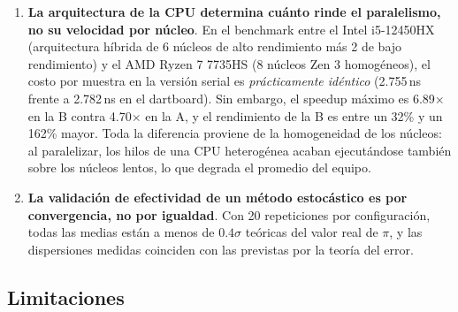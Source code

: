 \begin{enumerate}
    \item \textbf{La arquitectura de la CPU determina cuánto rinde el paralelismo, no su velocidad por núcleo}. En el benchmark entre el Intel i5-12450HX (arquitectura híbrida de 6 núcleos de alto rendimiento más 2 de bajo rendimiento) y el AMD Ryzen 7 7735HS (8 núcleos Zen 3 homogéneos), el costo por muestra en la versión serial es \emph{prácticamente idéntico} (2.755\,ns frente a 2.782\,ns en el dartboard). Sin embargo, el speedup máximo es 6.89$\times$ en la B contra 4.70$\times$ en la A, y el rendimiento de la B es entre un 32\% y un 162\% mayor. Toda la diferencia proviene de la homogeneidad de los núcleos: al paralelizar, los hilos de una CPU heterogénea acaban ejecutándose también sobre los núcleos lentos, lo que degrada el promedio del equipo.

    \item \textbf{La validación de efectividad de un método estocástico es por convergencia, no por igualdad}. Con 20 repeticiones por configuración, todas las medias están a menos de $0.4\sigma$ teóricas del valor real de $\pi$, y las dispersiones medidas coinciden con las previstas por la teoría del error.
\end{enumerate}

\subsection{Limitaciones}

